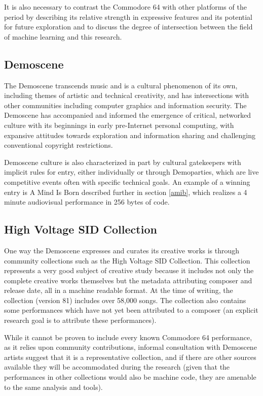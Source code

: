 \documentclass[10pt]{article}
\begin{document}
\begin{multicols*}{2}
It is also necessary to contrast the Commodore 64 with other platforms of the period by describing its relative strength in expressive features and its potential for future exploration and to discuss the degree of intersection between the field of machine learning and this research.

\subsection{Demoscene}

The Demoscene transcends music and is a cultural phenomenon of its own\cite{hackingpractices}, including themes of artistic and technical creativity, and has intersections with other communities including computer graphics\cite{siggraphdemo} and information security\cite{layerone}. The Demoscene has accompanied and informed the emergence of critical, networked culture with its beginnings in early pre-Internet personal computing\cite{pioneers}, with expansive attitudes towards exploration and information sharing and challenging conventional copyright restrictions.

Demoscene culture is also characterized in part by cultural gatekeepers with implicit rules for entry\cite{gatekeepers}, either individually or through Demoparties\cite{assembly}, which are live competitive events often with specific technical goals. An example of a winning entry is A Mind Is Born described further in section \ref{amib}, which realizes a 4 minute audiovisual performance in 256 bytes of code.

\subsection{High Voltage SID Collection}
\label{hvsc}

One way the Demoscene expresses and curates its creative works is through community collections such as the High Voltage SID Collection\cite{hvsc}. This collection represents a very good subject of creative study because it includes not only the complete creative works themselves but the metadata attributing composer and release date, all in a machine readable format. At the time of writing, the collection (version 81) includes over 58,000 songs. The collection also contains some performances which have not yet been attributed to a composer (an explicit research goal is to attribute these performances).

While it cannot be proven to include every known Commodore 64 performance, as it relies upon community contributions, informal consultation with Demoscene artists suggest that it is a representative collection, and if there are other sources available they will be accommodated during the research (given that the performances in other collections would also be machine code, they are amenable to the same analysis and tools).


\end{multicols*}
\end{document}
